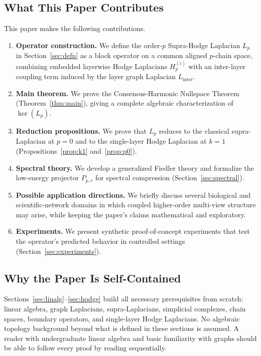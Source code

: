 \documentclass[11pt]{article}
\theoremstyle{definition}
\theoremstyle{remark}
\begin{document}
\subsection{What This Paper Contributes}
\label{subsec:contributions}

This paper makes the following contributions.
\begin{enumerate}
\item \textbf{Operator construction.} We define the order-$p$ Supra-Hodge
      Laplacian $L_p$ in Section~\ref{sec:defn} as a block operator on a common
      aligned $p$-chain space, combining embedded layerwise Hodge Laplacians
      $H_p^{(i)}$ with an inter-layer coupling term induced by the layer graph
      Laplacian $L_{\mathrm{inter}}$.
\item \textbf{Main theorem.} We prove the Consensus-Harmonic Nullspace
      Theorem (Theorem~\ref{thm:main}), giving a complete algebraic
      characterization of $\ker(L_p)$.
\item \textbf{Reduction propositions.} We prove that $L_p$ reduces to the
      classical supra-Laplacian at $p=0$ and to the single-layer Hodge
      Laplacian at $k=1$ (Propositions~\ref{prop:k1} and~\ref{prop:p0}).
\item \textbf{Spectral theory.} We develop a generalized Fiedler theory and
      formalize the low-energy projector $P_{p,r}$ for spectral compression
      (Section~\ref{sec:spectral}).
\item \textbf{Possible application directions.} We briefly discuss several biological and scientific-network domains in which coupled higher-order multi-view structure may arise, while keeping the paper's claims mathematical and exploratory.
\item \textbf{Experiments.} We present synthetic proof-of-concept experiments
      that test the operator's predicted behavior in controlled settings
      (Section~\ref{sec:experiments}).
\end{enumerate}

\subsection{Why the Paper Is Self-Contained}
\label{subsec:selfcontained}

Sections~\ref{sec:linalg}--\ref{sec:hodge} build all necessary prerequisites
from scratch: linear algebra, graph Laplacians, supra-Laplacians, simplicial
complexes, chain spaces, boundary operators, and single-layer Hodge Laplacians.
No algebraic topology background beyond what is defined in these sections is
assumed. A reader with undergraduate linear algebra and basic familiarity with
graphs should be able to follow every proof by reading sequentially.
\end{document}
